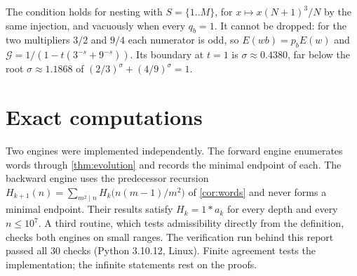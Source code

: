 \documentclass[11pt,a4paper]{article}
\begin{document}
The condition holds for nesting with \(S=\{1..M\}\), for
\(x\mapsto x(N+1)^3/N\) by the same injection, and vacuously when every
\(q_b=1\). It cannot be dropped: for the two multipliers \(3/2\) and
\(9/4\) each numerator is odd, so \(E(wb)=p_bE(w)\) and
\(\mathcal G=1/(1-t(3^{-s}+9^{-s}))\). Its boundary at \(t=1\) is
\(\sigma\approx0.4380\), far below the root \(\sigma\approx1.1868\) of
\((2/3)^{\sigma}+(4/9)^{\sigma}=1\).

\section{Exact computations}\label{sec:comp}
Two engines were implemented independently. The forward engine enumerates words through
\cref{thm:evolution} and records the minimal endpoint of each. The backward engine uses the predecessor
recursion $H_{k+1}(n)=\sum_{m^2\mid n}H_k\big(n(m-1)/m^2\big)$ of \cref{cor:words} and never forms a
minimal endpoint. Their results satisfy $H_k=1*a_k$ for every depth and every $n\le10^7$.
A third routine, which tests admissibility directly from the definition, checks both engines on small ranges.
The verification run behind this report passed all 30 checks (Python 3.10.12, Linux). Finite agreement tests the
implementation; the infinite statements rest on the proofs.
\end{document}
